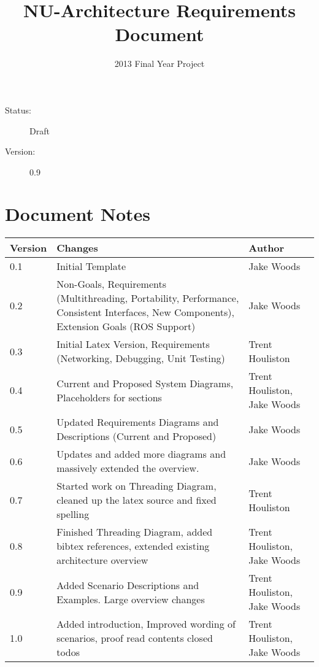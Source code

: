 \documentclass[english,12pt]{scrartcl}
\title{NU-Architecture Requirements Document}
\author{2013 Final Year Project}
\begin{document}
	\maketitle
	\vfill
	{\large
		\begin{description}
			\item [Status:] Draft
			\item [Version:] 0.9
		\end{description}}

	\clearpage
	\tableofcontents

	\section{Document Notes}
		\begin{tabular}{ p{} | p{} | p{} }
			\textbf{Version} & \textbf{Changes} & \textbf{Author} \\
			\hline

			0.1 &
			Initial Template &
			Jake Woods \\
			\hline

			0.2 &
			Non-Goals, Requirements (Multithreading, Portability, Performance, Consistent
			Interfaces, New Components), Extension Goals (ROS Support) &
			Jake Woods \\
			\hline

			0.3 &
			Initial Latex Version, Requirements (Networking, Debugging, Unit Testing) &
			Trent Houliston \\
			\hline

			0.4 &
			Current and Proposed System Diagrams, Placeholders for sections &
			Trent Houliston, Jake Woods \\
			\hline

			0.5 &
			Updated Requirements Diagrams and Descriptions (Current and Proposed) &
			Jake Woods \\
			\hline

			0.6 &
			Updates and added more diagrams and massively extended the overview. &
			Jake Woods \\
			\hline

			0.7 &
			Started work on Threading Diagram, cleaned up the latex source and fixed spelling &
			Trent Houliston \\
			\hline

			0.8 &
			Finished Threading Diagram, added bibtex references, extended existing architecture
			overview &
			Trent Houliston, Jake Woods \\
			\hline
			
			0.9 &
			Added Scenario Descriptions and Examples. Large overview changes &
			Trent Houliston, Jake Woods \\
			\hline
			
			1.0 &
			Added introduction, Improved wording of scenarios, proof read contents closed todos &
			Trent Houliston, Jake Woods \\
			\hline
		\end{tabular}
		
\end{document}
